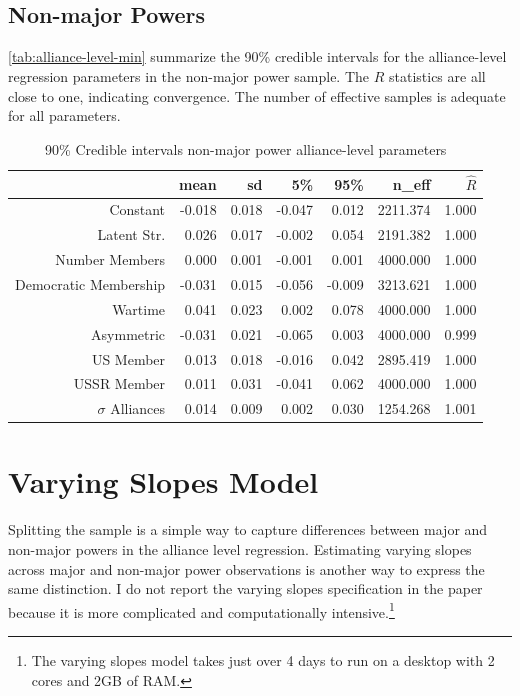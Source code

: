 \documentclass[12pt]{article}
\begin{document}
\subsection{Non-major Powers} 

\autoref{tab:alliance-level-min} summarize the 90\% credible intervals for the alliance-level regression parameters in the non-major power sample. The $\hat{R}$ statistics are all close to one, indicating convergence. The number of effective samples is adequate for all parameters.

\begin{table}[ht]
\centering
\begin{tabular}{rrrrrrr}
  \hline
 & mean & sd & 5\% & 95\% & n\_eff & $\hat{R}$ \\ 
  \hline
Constant & -0.018 & 0.018 & -0.047 & 0.012 & 2211.374 & 1.000 \\ 
  Latent Str. & 0.026 & 0.017 & -0.002 & 0.054 & 2191.382 & 1.000 \\ 
  Number Members & 0.000 & 0.001 & -0.001 & 0.001 & 4000.000 & 1.000 \\ 
  Democratic Membership & -0.031 & 0.015 & -0.056 & -0.009 & 3213.621 & 1.000 \\ 
  Wartime & 0.041 & 0.023 & 0.002 & 0.078 & 4000.000 & 1.000 \\ 
  Asymmetric & -0.031 & 0.021 & -0.065 & 0.003 & 4000.000 & 0.999 \\ 
  US Member & 0.013 & 0.018 & -0.016 & 0.042 & 2895.419 & 1.000 \\ 
  USSR Member & 0.011 & 0.031 & -0.041 & 0.062 & 4000.000 & 1.000 \\ 
  $\sigma$ Alliances & 0.014 & 0.009 & 0.002 & 0.030 & 1254.268 & 1.001 \\ 
   \hline
\end{tabular}
\caption{90\% Credible intervals non-major power alliance-level parameters}
\label{tab:alliance-level-min}
\end{table}


\section{Varying Slopes Model}

Splitting the sample is a simple way to capture differences between major and non-major powers in the alliance level regression. 
Estimating varying slopes across major and non-major power observations is another way to express the same distinction. 
I do not report the varying slopes specification in the paper because it is more complicated and computationally intensive.\footnote{The varying slopes model takes just over 4 days to run on a desktop with 2 cores and 2GB of RAM.}  
\end{document}
